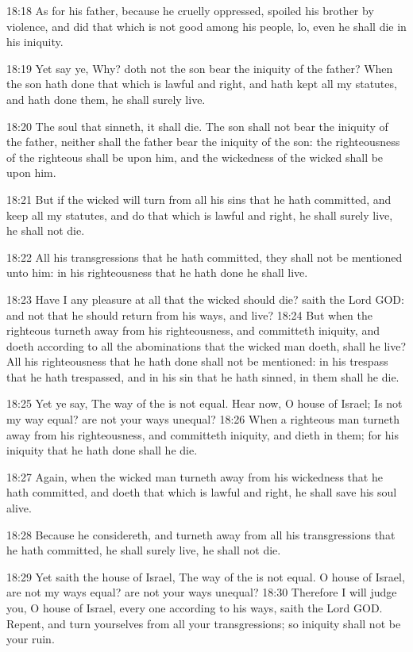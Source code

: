18:18 As for his father, because he cruelly oppressed, spoiled his brother by violence, and did that which is not good among his people, lo, even he shall die in his iniquity.

18:19 Yet say ye, Why? doth not the son bear the iniquity of the father?  When the son hath done that which is lawful and right, and hath kept all my statutes, and hath done them, he shall surely live.

18:20 The soul that sinneth, it shall die. The son shall not bear the iniquity of the father, neither shall the father bear the iniquity of the son: the righteousness of the righteous shall be upon him, and the wickedness of the wicked shall be upon him.

18:21 But if the wicked will turn from all his sins that he hath committed, and keep all my statutes, and do that which is lawful and right, he shall surely live, he shall not die.

18:22 All his transgressions that he hath committed, they shall not be mentioned unto him: in his righteousness that he hath done he shall live.

18:23 Have I any pleasure at all that the wicked should die? saith the Lord GOD: and not that he should return from his ways, and live?  18:24 But when the righteous turneth away from his righteousness, and committeth iniquity, and doeth according to all the abominations that the wicked man doeth, shall he live? All his righteousness that he hath done shall not be mentioned: in his trespass that he hath trespassed, and in his sin that he hath sinned, in them shall he die.

18:25 Yet ye say, The way of the \LORD is not equal. Hear now, O house of Israel; Is not my way equal? are not your ways unequal?  18:26 When a righteous man turneth away from his righteousness, and committeth iniquity, and dieth in them; for his iniquity that he hath done shall he die.

18:27 Again, when the wicked man turneth away from his wickedness that he hath committed, and doeth that which is lawful and right, he shall save his soul alive.

18:28 Because he considereth, and turneth away from all his transgressions that he hath committed, he shall surely live, he shall not die.

18:29 Yet saith the house of Israel, The way of the \LORD is not equal.  O house of Israel, are not my ways equal? are not your ways unequal?  18:30 Therefore I will judge you, O house of Israel, every one according to his ways, saith the Lord GOD. Repent, and turn yourselves from all your transgressions; so iniquity shall not be your ruin.

